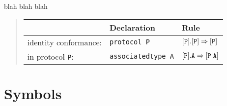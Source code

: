 \documentclass[../generics]{subfiles}
\begin{document}
blah blah blah
\begin{quote}
\begin{tabular}{lll}
\toprule
&\textbf{Declaration}&\textbf{Rule}\\
\midrule
identity conformance:&\texttt{protocol P}&$[\texttt{P}].[\texttt{P}]\Rightarrow[\texttt{P}]$\\
in protocol \texttt{P}:&\texttt{associatedtype A}&$[\texttt{P}].\texttt{A}\Rightarrow[\texttt{P}|\texttt{A}]$\\
\bottomrule
\end{tabular}
\end{quote}

\section{Symbols}
\end{document}
